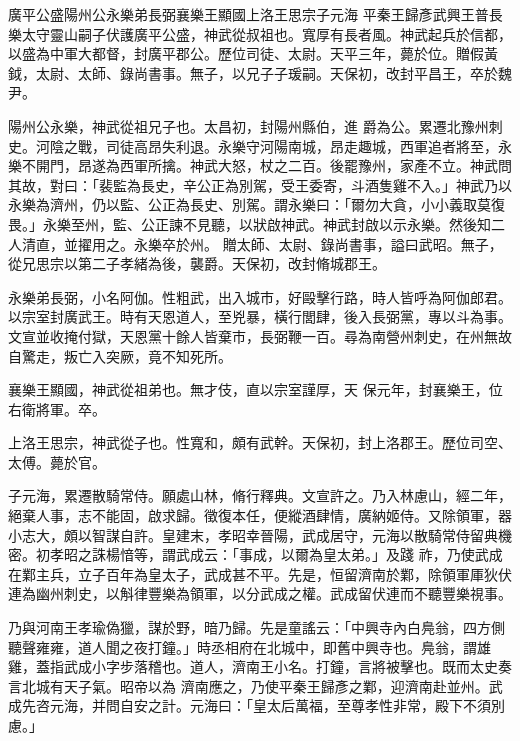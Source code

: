 
\begin{pinyinscope}

 廣平公盛陽州公永樂弟長弼襄樂王顯國上洛王思宗子元海
 平秦王歸彥武興王普長樂太守靈山嗣子伏護廣平公盛，神武從叔祖也。寬厚有長者風。神武起兵於信都，以盛為中軍大都督，封廣平郡公。歷位司徒、太尉。天平三年，薨於位。贈假黃鉞，太尉、太師、錄尚書事。無子，以兄子子瑗嗣。天保初，改封平昌王，卒於魏尹。



 陽州公永樂，神武從祖兄子也。太昌初，封陽州縣伯，進
 爵為公。累遷北豫州刺史。河陰之戰，司徒高昂失利退。永樂守河陽南城，昂走趣城，西軍追者將至，永樂不開門，昂遂為西軍所擒。神武大怒，杖之二百。後罷豫州，家產不立。神武問其故，對曰：「裴監為長史，辛公正為別駕，受王委寄，斗酒隻雞不入。」神武乃以永樂為濟州，仍以監、公正為長史、別駕。謂永樂曰：「爾勿大貪，小小義取莫復畏。」永樂至州，監、公正諫不見聽，以狀啟神武。神武封啟以示永樂。然後知二人清直，並擢用之。永樂卒於州。
 贈太師、太尉、錄尚書事，謚曰武昭。無子，從兄思宗以第二子孝緒為後，襲爵。天保初，改封脩城郡王。



 永樂弟長弼，小名阿伽。性粗武，出入城市，好毆擊行路，時人皆呼為阿伽郎君。以宗室封廣武王。時有天恩道人，至兇暴，橫行閭肆，後入長弼黨，專以斗為事。文宣並收掩付獄，天恩黨十餘人皆棄市，長弼鞭一百。尋為南營州刺史，在州無故自驚走，叛亡入突厥，竟不知死所。



 襄樂王顯國，神武從祖弟也。無才伎，直以宗室謹厚，天
 保元年，封襄樂王，位右衛將軍。卒。



 上洛王思宗，神武從子也。性寬和，頗有武幹。天保初，封上洛郡王。歷位司空、太傅。薨於官。



 子元海，累遷散騎常侍。願處山林，脩行釋典。文宣許之。乃入林慮山，經二年，絕棄人事，志不能固，啟求歸。徵復本任，便縱酒肆情，廣納姬侍。又除領軍，器小志大，頗以智謀自許。皇建末，孝昭幸晉陽，武成居守，元海以散騎常侍留典機密。初孝昭之誅楊愔等，謂武成云：「事成，以爾為皇太弟。」及踐
 祚，乃使武成在鄴主兵，立子百年為皇太子，武成甚不平。先是，恒留濟南於鄴，除領軍厙狄伏連為幽州刺史，以斛律豐樂為領軍，以分武成之權。武成留伏連而不聽豐樂視事。



 乃與河南王孝瑜偽獵，謀於野，暗乃歸。先是童謠云：「中興寺內白鳧翁，四方側聽聲雍雍，道人聞之夜打鐘。」時丞相府在北城中，即舊中興寺也。鳧翁，謂雄雞，蓋指武成小字步落稽也。道人，濟南王小名。打鐘，言將被擊也。既而太史奏言北城有天子氣。昭帝以為
 濟南應之，乃使平秦王歸彥之鄴，迎濟南赴並州。武成先咨元海，并問自安之計。元海曰：「皇太后萬福，至尊孝性非常，殿下不須別慮。」




\end{pinyinscope}
